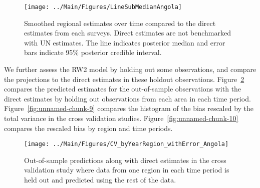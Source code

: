 \documentclass[12pt]{article}\usepackage[]{graphicx}\usepackage[]{color}
\newenvironment{knitrout}{}{} %
\begin{document}
\begin{knitrout}
\color{fgcolor}\begin{figure}[bht]

{\centering \texttt{[image: ../Main/Figures/LineSubMedianAngola]} 

}

\caption[Smoothed regional estimates over time compared to the direct estimates from each surveys]{Smoothed regional estimates over time compared to the direct estimates from each surveys. Direct estimates are not benchmarked with UN estimates. The line indicates posterior median and error bars indicate 95\% posterior credible interval.}\label{fig:unnamed-chunk-7}
\end{figure}


\end{knitrout}
We further assess the RW2 model by holding out some observations, and compare the projections to the direct estimates in these holdout observations. Figure~\ref{fig:unnamed-chunk-8} compares the predicted estimates for the out-of-sample observations  with the direct estimates by holding out observations from each area in each time period.  Figure~\ref{fig:unnamed-chunk-9} compares the histogram of the bias rescaled by the total variance in the cross validation studies. Figure~\ref{fig:unnamed-chunk-10} compares the rescaled bias by region and time periods.



 
\begin{knitrout}
\color{fgcolor}\begin{figure}[bht]

{\centering \texttt{[image: ../Main/Figures/CV\_byYearRegion\_withError\_Angola]} 

}

\caption[Out-of-sample predictions along with direct estimates in the cross validation study where data from one region in each time period is held out and predicted using the rest of the data]{Out-of-sample predictions along with direct estimates in the cross validation study where data from one region in each time period is held out and predicted using the rest of the data.}\label{fig:unnamed-chunk-8}
\end{figure}


\end{knitrout}
\end{document}
